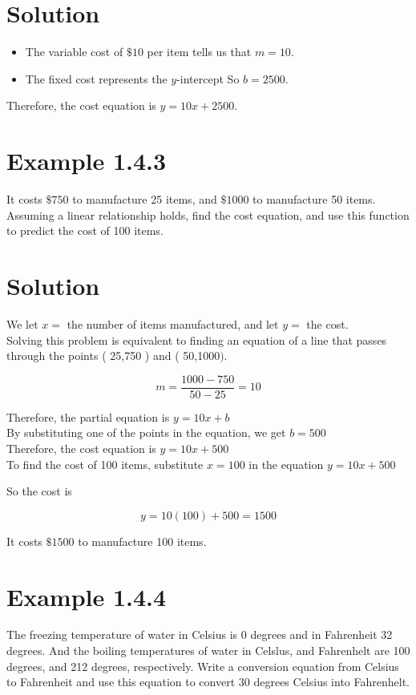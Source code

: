 \section*{Solution}
\begin{itemize}
  \item The variable cost of $\$ 10$ per item tells us that $m=10$.
  \item The fixed cost represents the $y$-intercept So $b=2500$.
\end{itemize}

Therefore, the cost equation is $y=10 x+2500$.

\section*{Example 1.4.3}
It costs $\$ 750$ to manufacture 25 items, and $\$ 1000$ to manufacture 50 items. Assuming a linear relationship holds, find the cost equation, and use this function to predict the cost of 100 items.

\section*{Solution}
We let $x=$ the number of items manufactured, and let $y=$ the cost.\\
Solving this problem is equivalent to finding an equation of a line that passes through the points ( 25,750 ) and ( 50,1000$)$.

$$
m=\frac{1000-750}{50-25}=10
$$

Therefore, the partial equation is $y=10 x+b$\\
By substituting one of the points in the equation, we get $b=500$\\
Therefore, the cost equation is $y=10 x+500$\\
To find the cost of 100 items, substitute $x=100$ in the equation $y=10 x+500$

So the cost is

$$
y=10(100)+500=1500
$$

It costs $\$ 1500$ to manufacture 100 items.

\section*{Example 1.4.4}
The freezing temperature of water in Celsius is 0 degrees and in Fahrenheit 32 degrees. And the boiling temperatures of water in Celslus, and Fahrenhelt are 100 degrees, and 212 degrees, respectively. Write a conversion equation from Celsius to Fahrenheit and use this equation to convert 30 degrees Celsius into Fahrenhelt.

